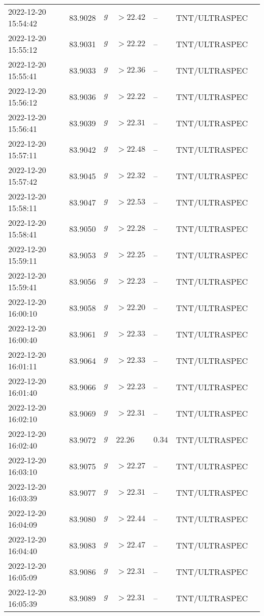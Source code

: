 \documentclass{nature_plusfigure}
\begin{document}
\begin{supplement}
\begin{center}
\begin{longtable}{lllllll}
2022-12-20 15:54:42 & 83.9028 & $g$ & $>22.42$ & -- & TNT/ULTRASPEC &  \\ 
2022-12-20 15:55:12 & 83.9031 & $g$ & $>22.22$ & -- & TNT/ULTRASPEC &  \\ 
2022-12-20 15:55:41 & 83.9033 & $g$ & $>22.36$ & -- & TNT/ULTRASPEC &  \\ 
2022-12-20 15:56:12 & 83.9036 & $g$ & $>22.22$ & -- & TNT/ULTRASPEC &  \\ 
2022-12-20 15:56:41 & 83.9039 & $g$ & $>22.31$ & -- & TNT/ULTRASPEC &  \\ 
2022-12-20 15:57:11 & 83.9042 & $g$ & $>22.48$ & -- & TNT/ULTRASPEC &  \\ 
2022-12-20 15:57:42 & 83.9045 & $g$ & $>22.32$ & -- & TNT/ULTRASPEC &  \\ 
2022-12-20 15:58:11 & 83.9047 & $g$ & $>22.53$ & -- & TNT/ULTRASPEC &  \\ 
2022-12-20 15:58:41 & 83.9050 & $g$ & $>22.28$ & -- & TNT/ULTRASPEC &  \\ 
2022-12-20 15:59:11 & 83.9053 & $g$ & $>22.25$ & -- & TNT/ULTRASPEC &  \\ 
2022-12-20 15:59:41 & 83.9056 & $g$ & $>22.23$ & -- & TNT/ULTRASPEC &  \\ 
2022-12-20 16:00:10 & 83.9058 & $g$ & $>22.20$ & -- & TNT/ULTRASPEC &  \\ 
2022-12-20 16:00:40 & 83.9061 & $g$ & $>22.33$ & -- & TNT/ULTRASPEC &  \\ 
2022-12-20 16:01:11 & 83.9064 & $g$ & $>22.33$ & -- & TNT/ULTRASPEC &  \\ 
2022-12-20 16:01:40 & 83.9066 & $g$ & $>22.23$ & -- & TNT/ULTRASPEC &  \\ 
2022-12-20 16:02:10 & 83.9069 & $g$ & $>22.31$ & -- & TNT/ULTRASPEC &  \\ 
2022-12-20 16:02:40 & 83.9072 & $g$ & $22.26$ & $0.34$ & TNT/ULTRASPEC &  \\ 
2022-12-20 16:03:10 & 83.9075 & $g$ & $>22.27$ & -- & TNT/ULTRASPEC &  \\ 
2022-12-20 16:03:39 & 83.9077 & $g$ & $>22.31$ & -- & TNT/ULTRASPEC &  \\ 
2022-12-20 16:04:09 & 83.9080 & $g$ & $>22.44$ & -- & TNT/ULTRASPEC &  \\ 
2022-12-20 16:04:40 & 83.9083 & $g$ & $>22.47$ & -- & TNT/ULTRASPEC &  \\ 
2022-12-20 16:05:09 & 83.9086 & $g$ & $>22.31$ & -- & TNT/ULTRASPEC &  \\ 
2022-12-20 16:05:39 & 83.9089 & $g$ & $>22.31$ & -- & TNT/ULTRASPEC &  \\ 

\end{longtable}
\end{center}
\end{supplement}
\end{document}
